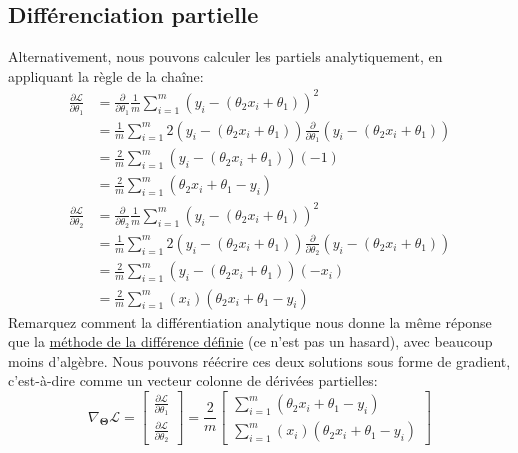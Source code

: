 %

\subsection{Différenciation partielle}

\noindent Alternativement, nous pouvons calculer les partiels analytiquement, en appliquant la règle de la chaîne:
%
\begin{align}
\frac{\partial\mathcal{L}}{\partial \theta_1} & = \frac{\partial}{\partial \theta_1}\frac{1}{m}\sum_{i=1}^m(y_i - (\theta_2 x_i + \theta_1))^2 \\ & = \frac{1}{m}\sum_{i=1}^m 2 (y_i - (\theta_2 x_i + \theta_1))\frac{\partial}{\partial \theta_1}(y_i - (\theta_2 x_i + \theta_1)) \\ & = \frac{2}{m}\sum_{i=1}^m(y_i - (\theta_2 x_i + \theta_1))(-1) \\ & = \boxed{\frac{2}{m}\sum_{i=1}^m(\theta_2 x_i + \theta_1 - y_i)}
\end{align}
%
\begin{align}
\frac{\partial\mathcal{L}}{\partial \theta_2} & = \frac{\partial}{\partial \theta_2}\frac{1}{m}\sum_{i=1}^m(y_i - (\theta_2 x_i + \theta_1))^2 \\ & = \frac{1}{m}\sum_{i=1}^m 2(y_i - (\theta_2 x_i + \theta_1)) \frac{\partial}{\partial \theta_2}(y_i - (\theta_2 x_i + \theta_1)) \\ & = \frac{2}{m}\sum_{i=1}^m(y_i - (\theta_2 x_i + \theta_1))(-x_i) \\ & = \boxed{\frac{2}{m}\sum_{i=1}^m(x_i)(\theta_2 x_i + \theta_1 - y_i)}
\end{align}
%
Remarquez comment la différentiation analytique nous donne la même réponse que la \hyperref[sec:fdm]{méthode de la différence définie} (ce n'est pas un hasard), avec beaucoup moins d'algèbre. Nous pouvons réécrire ces deux solutions sous forme de gradient, c'est-à-dire comme un vecteur colonne de dérivées partielles:
%
\begin{equation}
\nabla_{\bm\Theta}\mathcal{L} =
\begin{bmatrix}
\frac{\partial\mathcal{L}}{\partial \theta_1} \\
\frac{\partial\mathcal{L}}{\partial \theta_2}
\end{bmatrix} = \frac{2}{m}
\begin{bmatrix}
\sum_{i=1}^m(\theta_2 x_i + \theta_1 - y_i) \\ \sum_{i=1}^m(x_i)(\theta_2 x_i + \theta_1 - y_i)
\end{bmatrix}
\end{equation}


